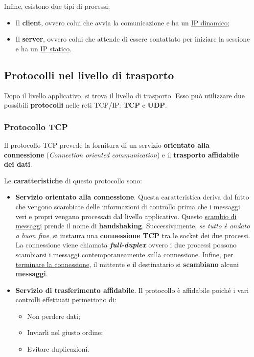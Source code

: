 \documentclass[a4paper]{article}
\begin{document}
	\noindent
	Infine, esistono due tipi di processi:
	
	\begin{itemize}
		\item Il \textbf{client}, ovvero colui che avvia la comunicazione e ha un \underline{IP dinamico};
		\item Il \textbf{server}, ovvero colui che attende di essere contattato per iniziare la sessione e ha un \underline{IP statico}.
	\end{itemize}

	\newpage
	
	\subsection{Protocolli nel livello di trasporto}
	
	Dopo il livello applicativo, si trova il livello di trasporto. Esso può utilizzare due possibili \textbf{protocolli} nelle reti TCP/IP: \textcolor{Red3}{\textbf{TCP}} e \textcolor{Red3}{\textbf{UDP}}.
	
	\subsubsection{Protocollo TCP}\label{protocollo TCP}
	
	Il protocollo TCP prevede la fornitura di un servizio \textbf{orientato alla connessione} (\emph{Connection oriented communication}) e il \textbf{trasporto affidabile dei dati}.\newline
	
	\noindent
	Le \textbf{caratteristiche} di questo protocollo sono:
	
	\begin{itemize}
		\item \textcolor{Green4}{\textbf{Servizio orientato alla connessione}}. Questa caratteristica deriva dal fatto che vengono scambiate delle informazioni di controllo prima che i messaggi veri e propri vengano processati dal livello applicativo. Questo \underline{scambio di messaggi} prende il nome di \textbf{handshaking}.\newline
		Successivamente, \emph{se tutto è andato a buon fine}, si instaura una \textbf{connessione TCP} tra le socket dei due processi. La connessione viene chiamata \textbf{\emph{full-duplex}} ovvero i due processi possono scambiarsi i messaggi contemporaneamente sulla connessione.
		Infine, per \underline{terminare la connessione}, il mittente e il destinatario si \textbf{scambiano} alcuni \textbf{messaggi}.
		
		\item \textcolor{Green4}{\textbf{Servizio di trasferimento affidabile}}. Il protocollo è affidabile poiché i vari controlli effettuati permettono di:
		\begin{itemize}
			\item Non perdere dati;
			\item Inviarli nel giusto ordine;
			\item Evitare duplicazioni.
		\end{itemize}
	\end{itemize}
	
\end{document}
